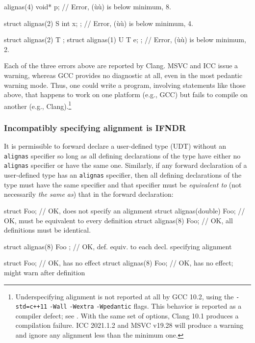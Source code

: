 \begin{emcppslisting}
alignas(4) void* p;              // Error, (ù{}ù) is below minimum, 8.

struct alignas(2) S { int x; };  // Error, (ù{}ù) is below minimum, 4.

struct alignas(2) T { };
struct alignas(1) U { T e; };    // Error, (ù{}ù) is below minimum, 2.
\end{emcppslisting}

\noindent Each of the three errors above are reported by Clang. MSVC and ICC issue a warning, whereas
 GCC
provides no diagnostic at all, even in the most pedantic warning mode. Thus, one could write a program,
involving statements like those above, that happens to work on one
platform (e.g., GCC) but fails to compile on another (e.g.,
Clang).{\cprotect\footnote{Underspecifying alignment is not reported at
all by GCC 10.2, using the
\lstinline!-std=c++11! \lstinline!-Wall! \lstinline!-Wextra! \mbox{\lstinline!-Wpedantic!}
flags. This behavior is reported as a compiler defect; see \cite{wakely15}. With the same set of options, Clang 10.1 produces a compilation
failure. ICC 2021.1.2 and MSVC v19.28 will produce a warning and ignore any alignment
  less than the minimum one.}}

\subsubsection[Incompatibly specifying alignment is IFNDR]{Incompatibly specifying alignment is IFNDR}\label{incompatibly-specifying-alignment-is-ifndr}

It is permissible to forward declare a user-defined type (UDT)
without an \lstinline!alignas! specifier so long as all defining
declarations of the type have either no \lstinline!alignas! specifier or
have the same one. Similarly, if any forward declaration of a
user-defined type has an \lstinline!alignas! specifier, then all defining
declarations of the type must have the same specifier and that specifier
must be \emph{equivalent to} (not necessarily \emph{the same as}) that
in the forward declaration:

\begin{emcppslisting}
struct Foo;                  // OK, does not specify an alignment
struct alignas(double) Foo;  // OK, must be equivalent to every definition
struct alignas(8) Foo;       // OK, all definitions must be identical.

struct alignas(8) Foo { };   // OK, def. equiv. to each decl. specifying alignment

struct Foo;                  // OK, has no effect
struct alignas(8) Foo;       // OK, has no effect; might warn after definition
\end{emcppslisting}

